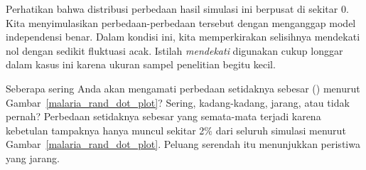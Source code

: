 Perhatikan bahwa distribusi perbedaan hasil simulasi ini
berpusat di sekitar 0.
Kita menyimulasikan perbedaan-perbedaan tersebut dengan menganggap
model independensi benar. Dalam kondisi ini,
kita memperkirakan selisihnya mendekati nol dengan sedikit
fluktuasi acak. Istilah \emph{mendekati} digunakan cukup longgar
dalam kasus ini karena ukuran sampel penelitian begitu kecil.

\begin{examplewrap}
\begin{nexample}{Seberapa sering Anda akan mengamati perbedaan
    setidaknya sebesar \malariaIRDiffPerc{} (\malariaIRDiff{})
    menurut Gambar~\ref{malaria_rand_dot_plot}?
    Sering, kadang-kadang, jarang, atau tidak pernah?}
  Perbedaan setidaknya sebesar \malariaIRDiffPerc{} yang
  semata-mata terjadi karena kebetulan tampaknya hanya muncul
  sekitar 2\% dari seluruh simulasi menurut
  Gambar~\ref{malaria_rand_dot_plot}.
  Peluang serendah itu menunjukkan peristiwa yang jarang.
\end{nexample}
\end{examplewrap}


